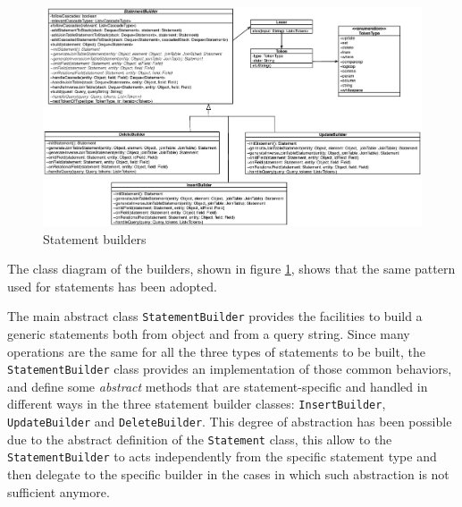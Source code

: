 \begin{figure}[tbh]
  \includegraphics[width=16cm]{images/builders}
  \caption{Statement builders}
  \label{fig:builders}
\end{figure} 

\noindent The class diagram of the builders, shown in figure \ref{fig:builders}, shows that the same pattern used for statements has been adopted.

\noindent The main abstract class \texttt{StatementBuilder} provides the facilities to build a generic statements both from object and from a query string.
Since many operations are the same for all the three types of statements to be built, the \texttt{StatementBuilder} class provides an implementation of those common behaviors, and define some \textit{abstract} methods that are statement-specific and handled in different ways in the three statement builder classes: \texttt{InsertBuilder}, \texttt{UpdateBuilder} and \texttt{DeleteBuilder}.
This degree of abstraction has been possible due to the abstract definition of the \texttt{Statement} class, this allow to the \texttt{StatementBuilder} to acts independently from the specific statement type and then delegate to the specific builder in the cases in which such abstraction is not sufficient anymore.

